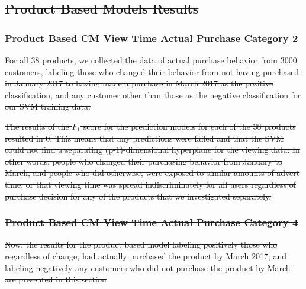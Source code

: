 \documentclass[review]{elsarticle}
\providecommand{\DIFdeltex}[1]{{\protect\color{red}\sout{#1}}}                      %
\providecommand{\DIFdelbegin}{} %
\providecommand{\DIFdelend}{} %
\providecommand{\DIFdel}[1]{\texorpdfstring{\DIFdeltex{#1}}{}} %
\newcommand{\DIFscaledelfig}{0.5}
\newlength{\DIFdelgraphicswidth} %
\newlength{\DIFdelgraphicsheight} %
\newcommand{\DIFdelincludegraphics}[2][]{%
\sbox{\DIFdelgraphicsbox}{\DIFOincludegraphics[#1]{#2}}%
\settoboxwidth{\DIFdelgraphicswidth}{\DIFdelgraphicsbox} %
\settoboxtotalheight{\DIFdelgraphicsheight}{\DIFdelgraphicsbox} %
\scalebox{\DIFscaledelfig}{%
\parbox[b]{\DIFdelgraphicswidth}{\usebox{\DIFdelgraphicsbox}\\[-\baselineskip] \rule{\DIFdelgraphicswidth}{0em}}\llap{\resizebox{\DIFdelgraphicswidth}{\DIFdelgraphicsheight}{%
\setlength{\unitlength}{\DIFdelgraphicswidth}%
\begin{picture}(1,1)%
\thicklines\linethickness{2pt} %
{\color[rgb]{1,0,0}\put(0,0){\framebox(1,1){}}}%
{\color[rgb]{1,0,0}\put(0,0){\line( 1,1){1}}}%
{\color[rgb]{1,0,0}\put(0,1){\line(1,-1){1}}}%
\end{picture}%
}\hspace*{3pt}}} %
} %
\DeclareRobustCommand{\DIFdelbegin}{\DIFOdelbegin \let\includegraphics\DIFdelincludegraphics} %
\DeclareRobustCommand{\DIFdelend}{\DIFOaddend \let\includegraphics\DIFOincludegraphics} %
\begin{document}
\DIFdelbegin \subsection{\DIFdel{Product Based Models Results}}
\addtocounter{subsection}{-1}%
\DIFdelend 

\DIFdelbegin \subsubsection{\DIFdel{Product Based CM View Time \textperiodcentered  Actual Purchase Category 2}}
\addtocounter{subsubsection}{-1}%

\DIFdel{For all 38 products, we collected the data of actual purchase behavior from 3000 customers, labeling those who changed their behavior from not having purchased in January 2017 to having made a purchase in March 2017 as the positive classification, and any customer other than those as the negative classification for our SVM training data. }%

\DIFdel{The results of the \(F_{1}\) score for the prediction models for each of the 38 products resulted in 0. This means that any predictions were failed and that the SVM could not find a separating (p-1)-dimensional hyperplane for the viewing data. In other words, people who changed their purchasing behavior from January to March, and people who did otherwise, were exposed to similar amounts of advert time, or that viewing time was spread indiscriminately for all users regardless of purchase decision for any of the products that we investigated separately. 
}%

\subsubsection{\DIFdel{Product Based CM View Time \textperiodcentered  Actual Purchase Category 4}}
\addtocounter{subsubsection}{-1}%

\DIFdel{Now, the results for the product based model labeling positively those who regardless of change, had actually purchased the product by March 2017; and labeling negatively any customers who did not purchase the product by March are presented in this section}\DIFdelend
\end{document}
